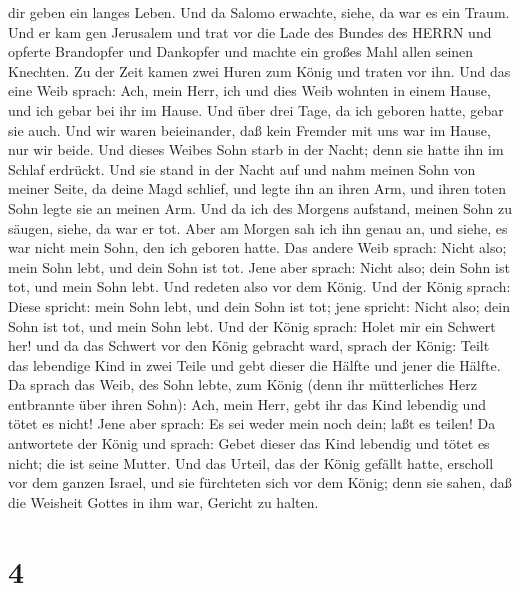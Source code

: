 dir geben ein langes Leben.  Und da Salomo erwachte, siehe,
da war es ein Traum. Und er kam gen Jerusalem und trat vor die Lade des
Bundes des HERRN und opferte Brandopfer und Dankopfer und machte ein
großes Mahl allen seinen Knechten.  Zu der Zeit kamen zwei
Huren zum König und traten vor ihn.  Und das eine Weib
sprach: Ach, mein Herr, ich und dies Weib wohnten in einem Hause, und
ich gebar bei ihr im Hause.  Und über drei Tage, da ich
geboren hatte, gebar sie auch. Und wir waren beieinander, daß kein
Fremder mit uns war im Hause, nur wir beide.  Und dieses
Weibes Sohn starb in der Nacht; denn sie hatte ihn im Schlaf erdrückt.
 Und sie stand in der Nacht auf und nahm meinen Sohn von
meiner Seite, da deine Magd schlief, und legte ihn an ihren Arm, und
ihren toten Sohn legte sie an meinen Arm.  Und da ich des
Morgens aufstand, meinen Sohn zu säugen, siehe, da war er tot. Aber am
Morgen sah ich ihn genau an, und siehe, es war nicht mein Sohn, den ich
geboren hatte.  Das andere Weib sprach: Nicht also; mein
Sohn lebt, und dein Sohn ist tot. Jene aber sprach: Nicht also; dein
Sohn ist tot, und mein Sohn lebt. Und redeten also vor dem König.
 Und der König sprach: Diese spricht: mein Sohn lebt, und
dein Sohn ist tot; jene spricht: Nicht also; dein Sohn ist tot, und mein
Sohn lebt.  Und der König sprach: Holet mir ein Schwert
her! und da das Schwert vor den König gebracht ward, 
sprach der König: Teilt das lebendige Kind in zwei Teile und gebt dieser
die Hälfte und jener die Hälfte.  Da sprach das Weib, des
Sohn lebte, zum König (denn ihr mütterliches Herz entbrannte über ihren
Sohn): Ach, mein Herr, gebt ihr das Kind lebendig und tötet es nicht!
Jene aber sprach: Es sei weder mein noch dein; laßt es teilen!
 Da antwortete der König und sprach: Gebet dieser das Kind
lebendig und tötet es nicht; die ist seine Mutter.  Und das
Urteil, das der König gefällt hatte, erscholl vor dem ganzen Israel, und
sie fürchteten sich vor dem König; denn sie sahen, daß die Weisheit
Gottes in ihm war, Gericht zu halten.

\hypertarget{section-3}{%
\section{4}\label{section-3}}

